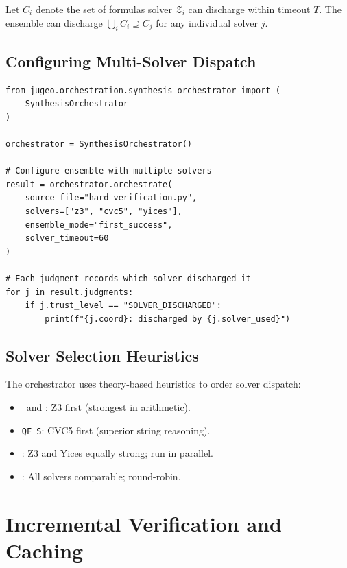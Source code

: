 \documentclass[11pt]{article}
\begin{document}
\begin{corollary}\label{cor:ensemble-complete}
Let $C_i$ denote the set of formulas solver $\mathcal{Z}_i$ can
discharge within timeout $T$.  The ensemble can discharge
$\bigcup_i C_i \supseteq C_j$ for any individual solver $j$.
\end{corollary}

\subsection{Configuring Multi-Solver Dispatch}

\begin{lstlisting}[style=jugeo-python]
from jugeo.orchestration.synthesis_orchestrator import (
    SynthesisOrchestrator
)

orchestrator = SynthesisOrchestrator()

# Configure ensemble with multiple solvers
result = orchestrator.orchestrate(
    source_file="hard_verification.py",
    solvers=["z3", "cvc5", "yices"],
    ensemble_mode="first_success",
    solver_timeout=60
)

# Each judgment records which solver discharged it
for j in result.judgments:
    if j.trust_level == "SOLVER_DISCHARGED":
        print(f"{j.coord}: discharged by {j.solver_used}")
\end{lstlisting}

\subsection{Solver Selection Heuristics}

The orchestrator uses theory-based heuristics to order solver
dispatch:
\begin{itemize}[noitemsep]
  \item \QFLIA\ and \QFLRA: Z3 first (strongest in arithmetic).
  \item \texttt{QF\_S}: CVC5 first (superior string reasoning).
  \item \QFBV: Z3 and Yices equally strong; run in parallel.
  \item \QFUF: All solvers comparable; round-robin.
\end{itemize}

\section{Incremental Verification and Caching}\label{sec:incremental}
\end{document}
